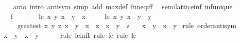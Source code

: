 \begin{isabellebody}
%
\isadelimproof
\ \ %
\endisadelimproof
%
\isatagproof
{}\isamarkupfalse%
\ {\isacharparenleft}{\kern0pt}auto\ intro{\isacharcolon}{\kern0pt}\ antisym\ simp\ add{\isacharcolon}{\kern0pt}\ max{\isacharunderscore}{\kern0pt}def\ fun{\isacharunderscore}{\kern0pt}eq{\isacharunderscore}{\kern0pt}iff{\isacharparenright}{\kern0pt}%
\endisatagproof
{\isafoldproof}%
%
\isadelimproof
%
\endisadelimproof
%
\isadelimdocument
%
\endisadelimdocument
%
\isatagdocument
%
\isamarkuptrue%
%
\endisatagdocument
{\isafolddocument}%
%
\isadelimdocument
%
\endisadelimdocument
{}\isamarkupfalse%
\ {\isacharparenleft}{\kern0pt}\ semilattice{\isacharunderscore}{\kern0pt}inf{\isacharparenright}{\kern0pt}\ inf{\isacharunderscore}{\kern0pt}unique{\isacharcolon}{\kern0pt}\isanewline
\ \ \ f\ \ {\isacharparenleft}{\kern0pt}\ {\isachardoublequoteopen}{\isasymtriangle}{\isachardoublequoteclose}\ {}{}{\isacharparenright}{\kern0pt}\isanewline
\ \ \ le{}{\isacharcolon}{\kern0pt}\ {\isachardoublequoteopen}{\isasymAnd}x\ y{\isachardot}{\kern0pt}\ x\ {\isasymtriangle}\ y\ {\isasymle}\ x{\isachardoublequoteclose}\isanewline
\ \ \ \ \ le{}{\isacharcolon}{\kern0pt}\ {\isachardoublequoteopen}{\isasymAnd}x\ y{\isachardot}{\kern0pt}\ x\ {\isasymtriangle}\ y\ {\isasymle}\ y{\isachardoublequoteclose}\isanewline
\ \ \ \ \ greatest{\isacharcolon}{\kern0pt}\ {\isachardoublequoteopen}{\isasymAnd}x\ y\ z{\isachardot}{\kern0pt}\ x\ {\isasymle}\ y\ {\isasymLongrightarrow}\ x\ {\isasymle}\ z\ {\isasymLongrightarrow}\ x\ {\isasymle}\ y\ {\isasymtriangle}\ z{\isachardoublequoteclose}\isanewline
\ \ \ {\isachardoublequoteopen}x\ {\isasymsqinter}\ y\ {\isacharequal}{\kern0pt}\ x\ {\isasymtriangle}\ y{\isachardoublequoteclose}\isanewline
%
\isadelimproof
%
\endisadelimproof
%
\isatagproof
{}\isamarkupfalse%
\ {\isacharparenleft}{\kern0pt}rule\ order{\isachardot}{\kern0pt}antisym{\isacharparenright}{\kern0pt}\isanewline
\ \ \isamarkupfalse%
\ {\isachardoublequoteopen}x\ {\isasymtriangle}\ y\ {\isasymle}\ x\ {\isasymsqinter}\ y{\isachardoublequoteclose}\isanewline
\ \ \ \ \isamarkupfalse%
\ {\isacharparenleft}{\kern0pt}rule\ le{\isacharunderscore}{\kern0pt}infI{\isacharparenright}{\kern0pt}\ {\isacharparenleft}{\kern0pt}rule\ le{}{\isacharcomma}{\kern0pt}\ rule\ le{}{\isacharparenright}{\kern0pt}\isanewline

\end{isabellebody}
